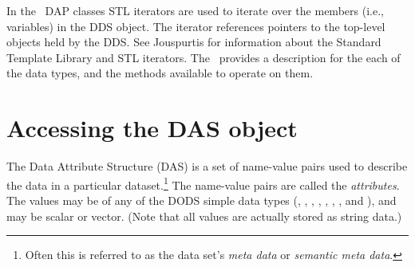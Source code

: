 \documentclass{dods-paper}
\begin{document}
In the \Cpp\ DAP classes STL iterators are used to iterate over the members
(i.e., variables) in the DDS object. The iterator  references pointers
to the top-level  objects held by the DDS. See
Jouspurtis\cite{josuttis:cpp-stl} for information about the Standard Template
Library and STL iterators. The \OPDapi\ provides
a description for the each of the data types, and the methods available to
operate on them.

 





    

\section{Accessing the DAS object}

The Data Attribute Structure (DAS) is a set of name-value pairs used to
describe the data in a particular dataset.\footnote{Often this is referred to
as the data set's \emph{meta data} or \emph{semantic meta data}.} The
name-value pairs are called the \emph{attributes}. The values may be of any
of the DODS simple data types (, , ,
, , , ,  and
), and may be scalar or vector. (Note that all values are actually
stored as string data.)
\end{document}
